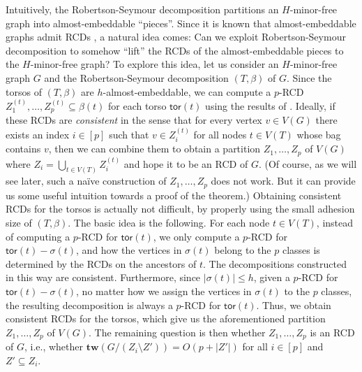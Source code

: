 \documentclass[a4paper,11pt]{article}
\numberwithin{lemma}{section}
\newcommand{\tw}{\mathbf{tw}}
\newcommand{\tor}{\mathsf{tor}}
\begin{document}
Intuitively, the Robertson-Seymour decomposition partitions an $H$-minor-free graph into almost-embeddable ``pieces''.
Since it is known that almost-embeddable graphs admit RCDs \cite{BandyapadhyayLLSJ22}, a natural idea comes:
Can we exploit Robertson-Seymour decomposition to somehow ``lift'' the RCDs of the almost-embeddable pieces to the $H$-minor-free graph?
To explore this idea, let us consider an $H$-minor-free graph $G$ and the Robertson-Seymour decomposition $(T,\beta)$ of $G$.
Since the torsos of $(T,\beta)$ are $h$-almost-embeddable, we can compute a $p$-RCD $Z_1^{(t)},\dots,Z_p^{(t)} \subseteq \beta(t)$ for each torso $\tor(t)$ using the results of \cite{BandyapadhyayLLSJ22}.
Ideally, if these RCDs are \emph{consistent} in the sense that for every vertex $v \in V(G)$ there exists an index $i \in [p]$ such that $v \in Z_i^{(t)}$ for all nodes $t \in V(T)$ whose bag contains $v$, then we can combine them to obtain a partition $Z_1,\dots,Z_p$ of $V(G)$ where $Z_i = \bigcup_{t \in V(T)} Z_i^{(t)}$ and hope it to be an RCD of $G$.
(Of course, as we will see later, such a na{\"i}ve construction of $Z_1,\dots,Z_p$ does not work. But it can provide us some useful intuition towards a proof of the theorem.)
Obtaining consistent RCDs for the torsos is actually not difficult, by properly using the small adhesion size of $(T,\beta)$.
The basic idea is the following.
For each node $t \in V(T)$, instead of computing a $p$-RCD for $\tor(t)$, we only compute a $p$-RCD for $\tor(t) - \sigma(t)$, and how the vertices in $\sigma(t)$ belong to the $p$ classes is determined by the RCDs on the ancestors of $t$.
The decompositions constructed in this way are consistent.
Furthermore, since $|\sigma(t)| \leq h$, given a $p$-RCD for $\tor(t) - \sigma(t)$, no matter how we assign the vertices in $\sigma(t)$ to the $p$ classes, the resulting decomposition is always a $p$-RCD for $\tor(t)$.
Thus, we obtain consistent RCDs for the torsos, which give us the aforementioned partition $Z_1,\dots,Z_p$ of $V(G)$.
The remaining question is then whether $Z_1,\dots,Z_p$ is an RCD of $G$, i.e., whether $\tw(G/(Z_i \setminus Z')) = O(p+|Z'|)$ for all $i \in [p]$ and $Z' \subseteq Z_i$.
\end{document}

